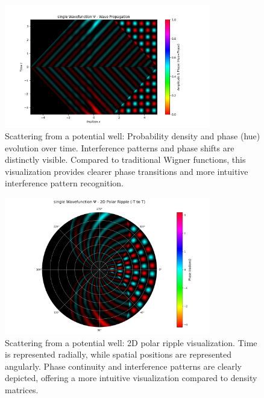 \documentclass[12pt]{article}
\begin{document}
\begin{figure}[H]
\centering
\includegraphics[width=0.8\textwidth]{images/scattering_wavefunction_probability_density_with_phase.png}
\caption{Scattering from a potential well: Probability density and phase (hue) evolution over time. Interference patterns and phase shifts are distinctly visible. Compared to traditional Wigner functions, this visualization provides clearer phase transitions and more intuitive interference pattern recognition.}
\label{fig:scattering_density}
\end{figure}

\begin{figure}[H]
\centering
\includegraphics[width=0.8\textwidth]{images/scattering_wavefunction_2d_polar_probability_density_with_phase.png}
\caption{Scattering from a potential well: 2D polar ripple visualization. Time is represented radially, while spatial positions are represented angularly. Phase continuity and interference patterns are clearly depicted, offering a more intuitive visualization compared to density matrices.}
\label{fig:scattering_2d_polar}
\end{figure}
\end{document}
